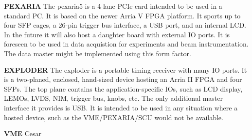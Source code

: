\textbf{PEXARIA}
The pexaria5 is a 4-lane PCIe card intended to be used in a standard PC.
It is based on the newer Arria V FPGA platform.
It sports up to four SFP cages, a 26-pin trigger bus interface,
a USB port, and an internal LCD.
In the future it will also host a daughter board with external IO
ports.
It is foreseen to be used in data acquistion for experiments
and beam instrumentation.
The data master might be implemented using this form factor.

\textbf{EXPLODER}
The exploder is a portable timing receiver with many IO ports.
It is a two-planed, enclosed, hand-sized device 
hosting an Arria II FPGA and four SFPs.
The top plane contains the application-specific IOs,
such as LCD display, LEMOs, LVDS, NIM, trigger bus, knobs, etc.
The only additional master interface it provides is USB.
It is intended to be used in any situation where a hosted device,
such as the VME/PEXARIA/SCU would not be available.

\textbf{VME}
Cesar


